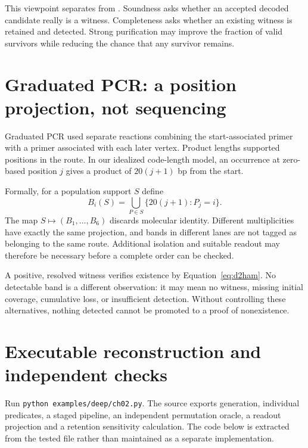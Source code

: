 This viewpoint separates  from . Soundness asks whether an accepted decoded candidate really is a witness. Completeness asks whether an existing witness is retained and detected. Strong purification may improve the fraction of valid survivors while reducing the chance that any survivor remains.

\section{Graduated PCR: a position projection, not sequencing}
Graduated PCR used separate reactions combining the start-associated primer with a primer associated with each later vertex. Product lengths supported positions in the route.\cite{adleman} In our idealized code-length model, an occurrence at zero-based position $j$ gives a product of $20(j+1)$ bp from the start.


Formally, for a population support $S$ define
\[
B_i(S)=\bigcup_{P\in S}\{20(j+1):P_j=i\}.
\]
The map $S\mapsto(B_1,\ldots,B_6)$ discards molecular identity. Different multiplicities have exactly the same projection, and bands in different lanes are not tagged as belonging to the same route. Additional isolation and suitable readout may therefore be necessary before a complete order can be checked.

A positive, resolved witness verifies existence by Equation~\ref{eq:d2ham}. No detectable band is a different observation: it may mean no witness, missing initial coverage, cumulative loss, or insufficient detection. Without controlling these alternatives, nothing detected cannot be promoted to a proof of nonexistence.

\Needspace{230pt}
\section{Executable reconstruction and independent checks}
Run \texttt{python examples/deep/ch02.py}. The source exports generation, individual predicates, a staged pipeline, an independent permutation oracle, a readout projection and a retention sensitivity calculation. The code below is extracted from the tested file rather than maintained as a separate implementation.

